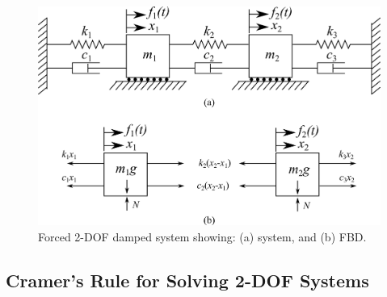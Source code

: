 \documentclass[12pt,letter]{article}
\numberwithin{ex}{section} %
\numberwithin{re}{section} %
\begin{document}
\begin{figure}[H]
	\centering
	\includegraphics[]{../Figures/2-DOF-spring_mass_dashpot_horizontal_double_wall.png}
	\caption{Forced 2-DOF damped system showing: (a) system, and (b) FBD.}
	\label{fig:2-DOF-spring_mass_dashpot_horizontal_double_wall}
\end{figure}


\subsection{Cramer's Rule for Solving 2-DOF Systems}
\end{document}

